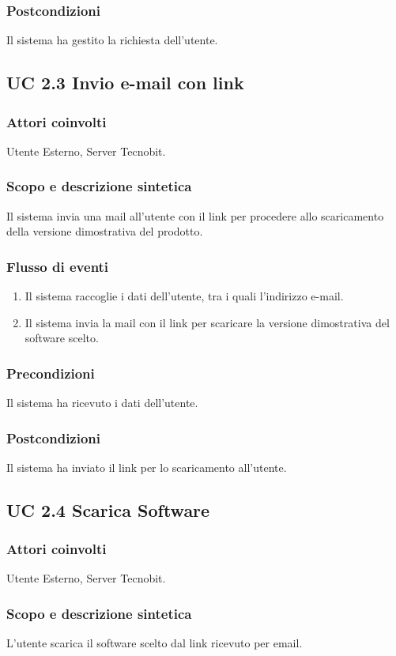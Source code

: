 \subsubsection*{Postcondizioni} Il sistema ha gestito la richiesta dell'utente.

\subsection*{UC 2.3 Invio e-mail con link}
\subsubsection*{Attori coinvolti} Utente Esterno, Server Tecnobit.
\subsubsection*{Scopo e descrizione sintetica}
Il sistema invia una mail all'utente con il link per procedere allo scaricamento della versione dimostrativa del prodotto.
\subsubsection*{Flusso di eventi}
\begin{enumerate}
\item Il sistema raccoglie i dati dell'utente, tra i quali l'indirizzo e-mail.
\item Il sistema invia la mail con il link per scaricare la versione dimostrativa del software scelto.
\end{enumerate}
\subsubsection*{Precondizioni} Il sistema ha ricevuto i dati dell'utente.
\subsubsection*{Postcondizioni} Il sistema ha inviato il link per lo scaricamento all'utente.

\subsection*{UC 2.4 Scarica Software}
\subsubsection*{Attori coinvolti} Utente Esterno, Server Tecnobit.
\subsubsection*{Scopo e descrizione sintetica}
L'utente scarica il software scelto dal link ricevuto per email.
